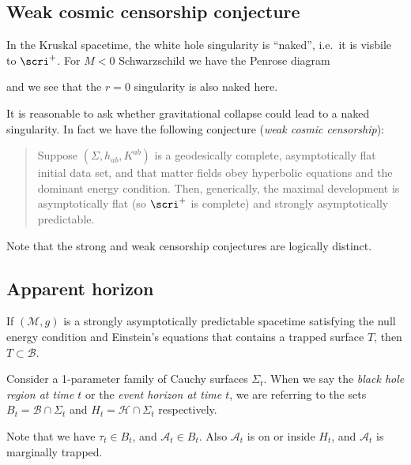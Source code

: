 \documentclass{jknotes}
\begin{document}
\subsection{Weak cosmic censorship conjecture}
In the Kruskal spacetime, the white hole singularity is ``naked'', i.e.\ it is visbile to \(\scri^+\). For \(M<0\) Schwarzschild we have the Penrose diagram
\begin{figure}[H]
    \centering
\end{figure}
and we see that the \(r=0\) singularity is also naked here.

It is reasonable to ask whether gravitational collapse could lead to a naked singularity. In fact we have the following conjecture (\emph{weak cosmic censorship}):
\begin{quote}
    Suppose \((\Sigma,h_{ab},K^{ab})\) is a geodesically complete, asymptotically flat initial data set, and that matter fields obey hyperbolic equations and the dominant energy condition. Then, generically, the maximal development is asymptotically flat (so \(\scri^+\) is complete) and strongly asymptotically predictable.
\end{quote}

Note that the strong and weak censorship conjectures are logically distinct.

\subsection{Apparent horizon}
\begin{theorem}
    If \((\mathcal{M},g)\) is a strongly asymptotically predictable spacetime satisfying the null energy condition and Einstein's equations that contains a trapped surface \(T\), then \(T\subset\mathcal{B}\).
\end{theorem}
Consider a 1-parameter family of Cauchy surfaces \(\Sigma_t\). When we say the \emph{black hole region at time \(t\)} or the \emph{event horizon at time \(t\)}, we are referring to the sets \(B_t = \mathcal{B}\cap \Sigma_t\) and \(H_t = \mathcal{H}\cap\Sigma_t\) respectively.
Note that we have \(\tau_t\in B_t\), and \(\mathcal{A}_t \in B_t\). Also \(\mathcal{A}_t\) is on or inside \(H_t\), and \(\mathcal{A}_t\) is marginally trapped.
\end{document}
